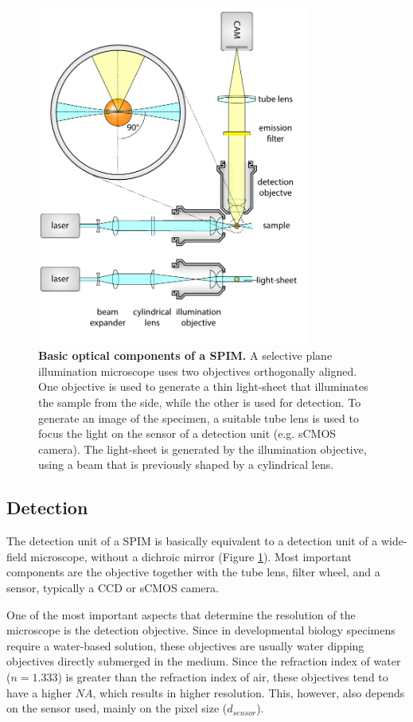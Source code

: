 \documentclass{diploma_style}
\begin{document}
\begin{figure}[htpb]
    \centering
    \includegraphics[page=1,width=0.8\textwidth]{figures/1_spim/spim_cyl}
    \caption{\textbf{Basic optical components of a SPIM.} A selective plane illumination microscope uses two objectives orthogonally aligned. One objective is used to generate a thin light-sheet that illuminates the sample from the side, while the other is used for detection. To generate an image of the specimen, a suitable tube lens is used to focus the light on the sensor of a detection unit (e.g. sCMOS camera). The light-sheet is generated by the illumination objective, using a beam that is previously shaped by a cylindrical lens.}
    \label{fig:light-sheet}
\end{figure}


\subsection{Detection}
The detection unit of a SPIM is basically equivalent to a detection unit of a wide-field microscope, without a dichroic mirror (Figure \ref{fig:light-sheet}). Most important components are the objective together with the tube lens, filter wheel, and a sensor, typically a CCD or sCMOS camera.

One of the most important aspects that determine the resolution of the microscope is the detection objective. Since in developmental biology specimens require a water-based solution, these objectives are usually water dipping objectives directly submerged in the medium. Since the refraction index of water ($n=1.333$) is greater than the refraction index of air, these objectives tend to have a higher $NA$, which results in higher resolution. This, however, also depends on the sensor used, mainly on the pixel size ($d_{sensor}$).
\end{document}
